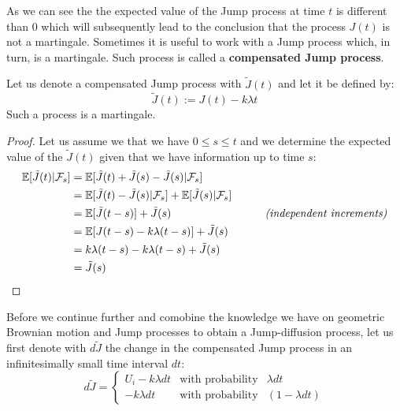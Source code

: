 \documentclass[times, utf8, diplomski]{fer}
\begin{document}
		\noindent As we can see the the expected value of the Jump process at time $t$ is different than $0$ which will subsequently lead to the conclusion that the process $J(t)$ is not a martingale. Sometimes it is useful to work with a Jump process which, in turn, is a martingale. Such process is called a \textbf{compensated Jump process}. 
		
		\begin{proposition} Let us denote a compensated Jump process with $\tilde{J}(t)$ and let it be defined by:
			\begin{equation}
			\tilde{J}(t) := J(t) - k\lambda t
			\end{equation}
			Such a process is a martingale.
		\end{proposition}
		\begin{proof}
			Let us assume we that we have $0 \leq s \leq t$ and we determine the expected value of the $\tilde{J}(t)$ given that we have information up to time $s$:
			\begin{align*}
				\mathbb{E}[\tilde{J}(t)|\mathcal{F}_s] &= \mathbb{E}[\tilde{J}(t) + \tilde{J}(s) - \tilde{J}(s)|\mathcal{F}_s] \\
				&= \mathbb{E}[\tilde{J}(t) - \tilde{J}(s)|\mathcal{F}_s] + \mathbb{E}[\tilde{J}(s)|\mathcal{F}_s] \\
				&= \mathbb{E}[\tilde{J}(t - s)] + \tilde{J}(s) \hspace{3cm} \mbox{\textit{(independent increments)}} \\
				&= \mathbb{E}[J(t - s) - k\lambda (t-s)] + \tilde{J}(s)\\
				&= k\lambda (t-s) - k\lambda (t-s) + \tilde{J}(s) \\
				&= \tilde{J}(s)
			\end{align*}
		\end{proof}

	\noindent Before we continue further and comobine the knowledge we have on geometric Brownian motion and Jump processes to obtain a Jump-diffusion process, let us first denote with $d\tilde{J}$ the change in the compensated Jump process in an infinitesimally small time interval $dt$:
	\begin{equation}
		d\tilde{J} = \left\{  \begin{array}{lcl} U_i - k\lambda dt& \mbox{with probability} & \lambda dt \\
																	- k\lambda dt & \mbox{with probability} & (1 - \lambda dt) \end{array} \right.
	\end{equation}
\end{document}
